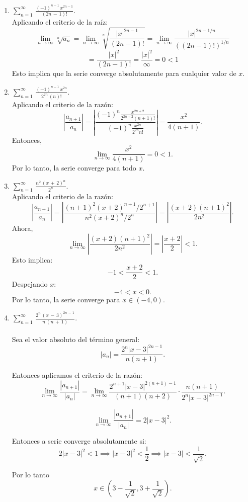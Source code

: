 \documentclass{article}
\begin{document}
\begin{enumerate}
\begin{enumerate}
\item $\displaystyle\sum_{n=1}^{\infty}\,\frac{(-1)^{n-1}\,x^{2n-1}}{(2n\,-\,1)!}$.
\[\]
Aplicando el criterio de la raíz:
\[
\lim_{n \to \infty} \sqrt[n]{a_n} = \lim_{n \to \infty} \sqrt[n]{\frac{|x|^{2n-1}}{(2n-1)!}} = \lim_{n \to \infty} \frac{|x|^{2n-1/n}}{((2n-1)!)^{1/n}}
\]
\[
= \frac{|x|^2}{(2n-1)!} = \frac{|x|^2}{\infty} = 0 < 1
\]
Esto implica que la serie converge absolutamente para cualquier valor de \(x\).

\item $\displaystyle\sum_{n=1}^{\infty}\,\frac{(-1)^{n-1}\,x^{2n}}{2^{2n}\,(n)!}$.
\[\]
Aplicando el criterio de la razón:
\[
\left| \frac{a_{n+1}}{a_n} \right| = \left| \frac{(-1)^n \frac{x^{2n+2}}{2^{2n+2}(n+1)!}}{(-1)^n \frac{x^{2n}}{2^{2n}n!}} \right| = \frac{x^2}{4(n+1)}.
\]
Entonces,
\[
\lim_{n \to \infty} \frac{x^2}{4(n+1)} = 0 < 1.
\]
Por lo tanto, la serie converge para todo \(x\).

\item $\displaystyle\sum_{n=1}^{\infty}\,\frac{n^2\,(x\,+\,2)^n}{2^n}$.
\[\]
Aplicando el criterio de la razón:
\[
\left| \frac{a_{n+1}}{a_n} \right| = \left| \frac{(n+1)^2 (x+2)^{n+1} / 2^{n+1}}{n^2 (x+2)^n / 2^n} \right| = \left| \frac{(x+2)(n+1)^2}{2n^2} \right|.
\]
Ahora,
\[
\lim_{n \to \infty} \left| \frac{(x+2)(n+1)^2}{2n^2} \right| = \left| \frac{x+2}{2} \right| < 1.
\]
Esto implica:
\[
-1 < \frac{x+2}{2} < 1.
\]
Despejando \(x\):
\[
-4 < x < 0.
\]
Por lo tanto, la serie converge para \(x \in (-4, 0)\).

\item $\displaystyle\sum_{n=1}^{\infty}\,\frac{2^n\,(x\,-\,3)^{2n\,-\,1}}{n\,(n\,+\,1)}$.\\
\\
Sea el valor absoluto del término general:
   \[
   \left|a_n\right| = \frac{2^n |x - 3|^{2n-1}}{n(n+1)}.
   \]

Entonces aplicamos el criterio de la razón:
   \[
   \lim_{n \to \infty} \frac{|a_{n+1}|}{|a_n|} = \lim_{n \to \infty} \frac{2^{n+1} |x - 3|^{2(n+1)-1}}{(n+1)(n+2)} \cdot \frac{n(n+1)}{2^n |x - 3|^{2n-1}}.
   \]

   \[
   \lim_{n \to \infty} \frac{|a_{n+1}|}{|a_n|} = 2 |x - 3|^2.
   \]

Entonces a serie converge absolutamente si:
   \[
   2 |x - 3|^2 < 1 \implies |x - 3|^2 < \frac{1}{2} \implies |x - 3| < \frac{1}{\sqrt{2}}.
   \]

Por lo tanto 
   \[
   x \in \left(3 - \frac{1}{\sqrt{2}}, 3 + \frac{1}{\sqrt{2}}\right).
   \]



\end{enumerate}
\end{enumerate}
\end{document}
